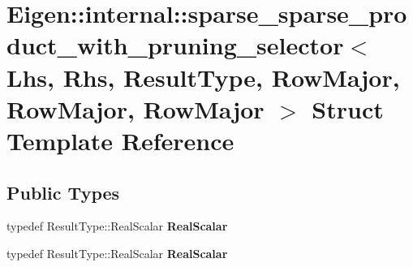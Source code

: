 \hypertarget{struct_eigen_1_1internal_1_1sparse__sparse__product__with__pruning__selector_3_01_lhs_00_01_rhs_ac6a83f16fa8af56c1b06b928dbc0536}{}\section{Eigen\+:\+:internal\+:\+:sparse\+\_\+sparse\+\_\+product\+\_\+with\+\_\+pruning\+\_\+selector$<$ Lhs, Rhs, Result\+Type, Row\+Major, Row\+Major, Row\+Major $>$ Struct Template Reference}
\label{struct_eigen_1_1internal_1_1sparse__sparse__product__with__pruning__selector_3_01_lhs_00_01_rhs_ac6a83f16fa8af56c1b06b928dbc0536}
\subsection*{Public Types}
\begin{DoxyCompactItemize}
\item 
\mbox{\label{struct_eigen_1_1internal_1_1sparse__sparse__product__with__pruning__selector_3_01_lhs_00_01_rhs_ac6a83f16fa8af56c1b06b928dbc0536_a8d32063834114722ee849e34a9a425a3}} 
typedef Result\+Type\+::\+Real\+Scalar {\bfseries Real\+Scalar}
\item 
\mbox{\label{struct_eigen_1_1internal_1_1sparse__sparse__product__with__pruning__selector_3_01_lhs_00_01_rhs_ac6a83f16fa8af56c1b06b928dbc0536_a8d32063834114722ee849e34a9a425a3}} 
typedef Result\+Type\+::\+Real\+Scalar {\bfseries Real\+Scalar}
\end{DoxyCompactItemize}
